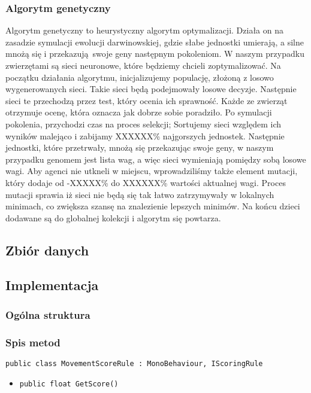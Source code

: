 \documentclass[12pt,a4paper]{article}
\begin{document}
\subsubsection{Algorytm genetyczny}
Algorytm genetyczny to heurystyczny algorytm optymalizacji. Działa on na zasadzie symulacji ewolucji darwinowskiej, gdzie
słabe jednostki umierają, a silne mnożą się i przekazują swoje geny następnym pokoleniom. W naszym przypadku zwierzętami
są sieci neuronowe, które będziemy chcieli zoptymalizować. Na początku działania algorytmu, inicjalizujemy 
populację, złożoną z losowo wygenerowanych sieci. Takie sieci będą podejmowały losowe decyzje. Następnie sieci te 
przechodzą przez test, który ocenia ich sprawność. Każde ze zwierząt otrzymuje ocenę, która oznacza jak dobrze sobie poradziło.
Po symulacji pokolenia, przychodzi czas na proces selekcji; Sortujemy sieci względem ich wyników malejąco i zabijamy XXXXXX\% najgorszych jednostek.
Następnie jednostki, które przetrwały, mnożą się przekazując swoje geny, w naszym przypadku genomem jest lista wag, a więc sieci wymieniają pomiędzy sobą losowe wagi.
Aby agenci nie utkneli w miejscu, wprowadziliśmy także element mutacji, który dodaje od -XXXXX\% do XXXXXX\% wartości aktualnej wagi.
Proces mutacji sprawia iż sieci nie będą się tak łatwo zatrzymywały w lokalnych minimach, co zwiększa szansę na znalezienie lepszych minimów.
Na końcu dzieci dodawane są do globalnej kolekcji i algorytm się powtarza.






\subsection*{Zbiór danych}




\subsection*{Implementacja}
\subsubsection*{Ogólna struktura}
\subsubsection*{Spis metod}
\lstinline{public class MovementScoreRule : MonoBehaviour, IScoringRule}
\begin{itemize}
    \item \lstinline|public float GetScore()|
\end{itemize}
\end{document}
